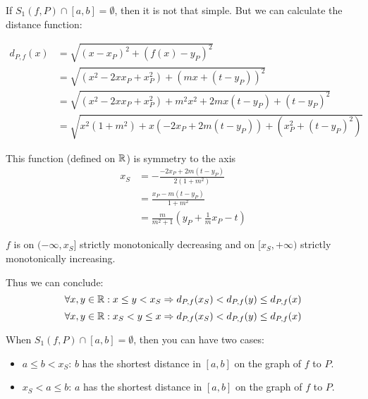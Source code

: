 If $S_1(f, P) \cap [a,b] = \emptyset$, then it is not that simple.
But we can calculate the distance function:

\begin{align}
    d_{P,f}(x) &= \sqrt{(x-x_P)^2 + (f(x) - y_P)^2}\\
    &= \sqrt{(x^2 - 2x x_P + x_P^2) + (mx + (t-y_P))^2}\\
    &= \sqrt{(x^2 - 2x x_P + x_P^2) + m^2 x^2 + 2mx(t-y_P) + (t-y_P)^2}\\
    &= \sqrt{x^2(1+m^2) + x(-2 x_P + 2m(t-y_P)) + (x_P^2 + (t-y_P)^2)}
\end{align}

This function (defined on $\mathbb{R}$) is symmetry to the axis
\begin{align}
    x_S &= - \frac{-2 x_P + 2m(t-y_P)}{2(1+m^2)}\\
    &= \frac{x_P - m(t-y_P)}{1+m^2}\\
    &= \frac{m}{m^2+1} (y_P + \frac{1}{m} x_P - t)
\end{align}

$f$ is on $(-\infty, x_S]$ strictly monotonically decreasing and
on $[x_S, + \infty)$ strictly monotonically increasing.

Thus we can conclude:
\[\forall x,y \in \mathbb{R}: x \leq y < x_S \Rightarrow d_{P,f}(x_S) < d_{P,f}(y) \leq d_{P,f}(x)\]
\[\forall x,y \in \mathbb{R}: x_S < y \leq x \Rightarrow d_{P,f}(x_S) < d_{P,f}(y) \leq d_{P,f}(x)\]

When $S_1(f, P) \cap [a,b] = \emptyset$, then you can have two cases:
\begin{itemize}
    \item $a \leq b < x_S$: $b$ has the shortest distance in $[a,b]$
             on the graph of $f$ to $P$.
    \item $x_S < a \leq b$: $a$ has the shortest distance in $[a,b]$
             on the graph of $f$ to $P$.
\end{itemize}
